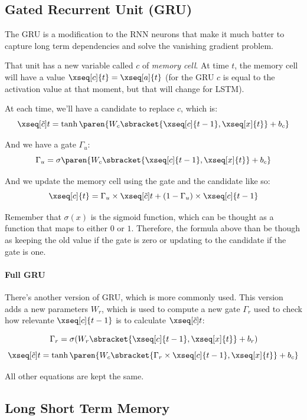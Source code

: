 \documentclass[12pt, a4paper, oneside]{book}
\begin{document}
\subsection{Gated Recurrent Unit (GRU)}%
\label{sub:gated_recurrent_unit_gru_}

The GRU is a modification to the RNN neurons that make it much batter to capture
long term dependencies and solve the vanishing gradient problem.

That unit has a new variable called $c$ of \textit{memory cell}. At time $t$,
the memory cell will have a value $\xseq[c]{t}=\xseq[a]{t}$ (for the GRU $c$ is
equal to the activation value at that moment, but that will change for LSTM).

At each time, we'll have a candidate to replace $c$, which is:
\[
\xseq[\tilde{c}]{t}=\tanh\paren{W_{c}\sbracket{\xseq[c]{t-1},\xseq[x]{t}}+b_c}
\]

And we have a gate $\Gamma_u$:
\[
\Gamma_u=\sigma\paren{W_{c}\sbracket{\xseq[c]{t-1},\xseq[x]{t}}+b_c}
\]

And we update the memory cell using the gate and the candidate like so:
\[
\xseq[c]{t}=\Gamma_u\times\xseq[\tilde{c}]{t}+(1-\Gamma_u)\times\xseq[c]{t-1}
\]

\begin{obs}
Remember that $\sigma(x)$ is the sigmoid function, which can be thought as a
function that maps to either $0$ or $1$. Therefore, the formula above than be
though as keeping the old value if the gate is zero or updating to the candidate
if the gate is one.
\end{obs}

\paragraph{Full GRU}%
\label{par:full_gru}

There's another version of GRU, which is more commonly used. This version adds a
new parameters $W_r$, which is used to compute a new gate $\Gamma_r$ used to
check how relevante $\xseq[c]{t-1}$ is to calculate $\xseq[\tilde{c}]{t}$:

\[
\Gamma_r=\sigma(W_r\sbracket{\xseq[c]{t-1},\xseq[x]{t}}+b_r)
\]
\[
\xseq[\tilde{c}]{t}=\tanh\paren{W_{c}\sbracket{\Gamma_r\times\xseq[c]{t-1},\xseq[x]{t}}+b_c}
\]

All other equations are kept the same.

\subsection{Long Short Term Memory}%
\label{sub:long_short_term_memory}
\end{document}

